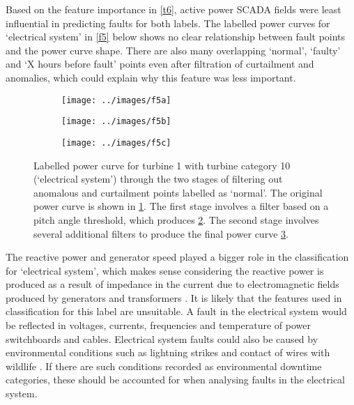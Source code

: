 Based on the feature importance in \autoref{t6}, active power SCADA fields
were least influential in predicting faults for both labels. The labelled
power curves for `electrical system' in \autoref{f5} below shows no clear
relationship between fault points and the power curve shape. There are also
many overlapping `normal', `faulty' and `X hours before fault' points even
after filtration of curtailment and anomalies, which could explain why this
feature was less important.

\begin{figure}
  \centering
  \begin{subfigure}[t]{.5\textwidth}
    \centering
    \texttt{[image: ../images/f5a]}
    \caption{\label{f5a}}
  \end{subfigure}%
  \begin{subfigure}[t]{.5\textwidth}
    \centering
    \texttt{[image: ../images/f5b]}
    \caption{\label{f5b}}
  \end{subfigure}
  \begin{subfigure}[t]{.5\textwidth}
    \centering
    \texttt{[image: ../images/f5c]}
    \caption{\label{f5c}}
  \end{subfigure}
  \caption{\label{f5}Labelled power curve for turbine 1 with turbine category
  10 (`electrical system') through the two stages of filtering out anomalous
  and curtailment points labelled as `normal'. The original power curve is
  shown in \ref{f5a}. The first stage involves a filter based on a pitch angle
  threshold, which produces \ref{f5b}. The second stage involves several
  additional filters to produce the final power curve \ref{f5c}.}
\end{figure}

The reactive power and generator speed played a bigger role in the
classification for `electrical system', which makes sense considering the
reactive power is produced as a result of impedance in the current due to
electromagnetic fields produced by generators and transformers \cite{React}.
It is likely that the features used in classification for this label are
unsuitable. A fault in the electrical system would be reflected in voltages,
currents, frequencies \cite{Overb} and temperature of power switchboards and
cables. Electrical system faults could also be caused by environmental
conditions such as lightning strikes and contact of wires with wildlife
\cite{Overb}. If there are such conditions recorded as environmental downtime
categories, these should be accounted for when analysing faults in the
electrical system.

